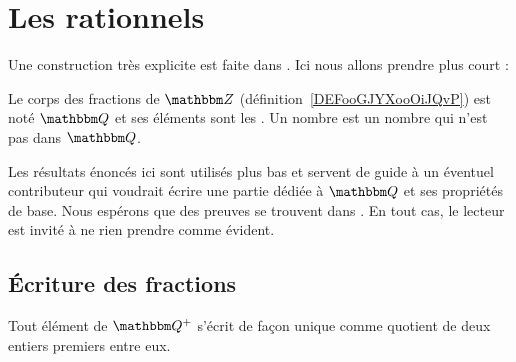 \section{Les rationnels}

Une construction très explicite est faite dans \cite{RWWJooJdjxEK}. Ici nous allons prendre plus court :
\begin{definition}
    Le corps des fractions de \( \eZ\) (définition~\ref{DEFooGJYXooOiJQvP}) est noté \( \eQ\) et ses éléments sont les . Un nombre  est un nombre qui n'est pas dans \( \eQ \).
\end{definition}

Les résultats énoncés ici sont utilisés plus bas et servent de guide à un éventuel contributeur qui voudrait écrire une partie dédiée à \( \eQ\) et ses propriétés de base. Nous espérons que des preuves se trouvent dans \cite{RWWJooJdjxEK}. En tout cas, le lecteur est invité à ne rien prendre comme évident.


\subsection{Écriture des fractions}

\begin{theorem}     \label{THOooWYQVooRBaAAM}
    Tout élément de \( \eQ^+\) s'écrit de façon unique comme quotient de deux entiers premiers entre eux.
\end{theorem}

